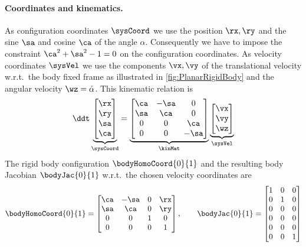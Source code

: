 \paragraph{Coordinates and kinematics.}
As configuration coordinates $\sysCoord$ we use the position $\rx,\ry$ and the sine $\sa$ and cosine $\ca$ of the angle $\alpha$.
Consequently we have to impose the constraint $\ca^2+\sa^2-1 = 0$ on the configuration coordinates.
As velocity coordinates $\sysVel$ we use the components $\vx, \vy$ of the translational velocity w.r.t.\ the body fixed frame as illustrated in \autoref{fig:PlanarRigidBody} and the angular velocity $\wz=\dot{\alpha}$.
This kinematic relation is
\begin{align}
 \ddt
 \underbrace{\begin{bmatrix} \rx \\ \ry \\ \sa \\ \ca \end{bmatrix}}_{\sysCoord}
 = 
 \underbrace{\begin{bmatrix} \ca & -\sa & 0 \\ \sa & \ca & 0 \\ 0 & 0 & \ca \\ 0 & 0 & -\sa \end{bmatrix}}_{\kinMat}
 \underbrace{\begin{bmatrix} \vx \\ \vy \\ \wz \end{bmatrix}}_{\sysVel}
\end{align}
The rigid body configuration $\bodyHomoCoord{0}{1}$ and the resulting body Jacobian $\bodyJac{0}{1}$ w.r.t.\ the chosen velocity coordinates are
\begin{align}
 \bodyHomoCoord{0}{1} = \begin{bmatrix} \ca & -\sa & 0 & \rx \\ \sa & \ca & 0 & \ry \\ 0 & 0 & 1 & 0 \\ 0 & 0 & 0 & 1 \end{bmatrix},
\qquad
 \bodyJac{0}{1} = \begin{bmatrix} 1 & 0 & 0 \\ 0 & 1 & 0 \\ 0 & 0 & 0 \\ 0 & 0 & 0 \\ 0 & 0 & 0 \\ 0 & 0 & 1 \end{bmatrix}
\end{align}

